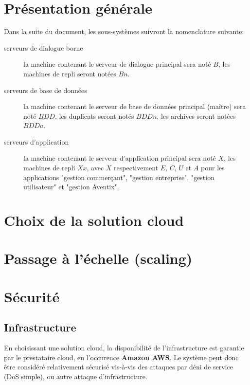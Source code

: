 




\section{Présentation générale}

Dans la suite du document, les sous-systèmes suivront la nomenclature suivante:

\begin{description}
    \item[serveurs de dialogue borne] la machine contenant le serveur de
        dialogue principal sera noté $B$, les machines de repli seront notées
        $Bn$.
    \item[serveurs de base de données] la machine contenant le serveur de base
        de données principal (maître) sera noté $BDD$, les duplicats seront
        notés $BDDn$, les archives seront notées $BDDa$.
    \item[serveurs d'application] la machine contenant le serveur d'application
        principal sera noté $X$, les machines de repli $Xx$, avec $X$
        respectivement $E$, $C$, $U$ et $A$ pour les applications "gestion
        commerçant", "gestion entreprise", "gestion utilisateur" et "gestion
        Aventix".
\end{description}

\section{Choix de la solution cloud}
\section{Passage à l'échelle (scaling)}

\section{Sécurité}

\subsection{Infrastructure}

En choisissant une solution cloud, la disponibilité de l'infrastructure est
garantie par le prestataire cloud, en l'occurence \textbf{Amazon AWS}. Le
système peut donc être considéré relativement sécurisé vis-à-vis des attaques
par déni de service (DoS simple), ou autre attaque d'infrastructure.

